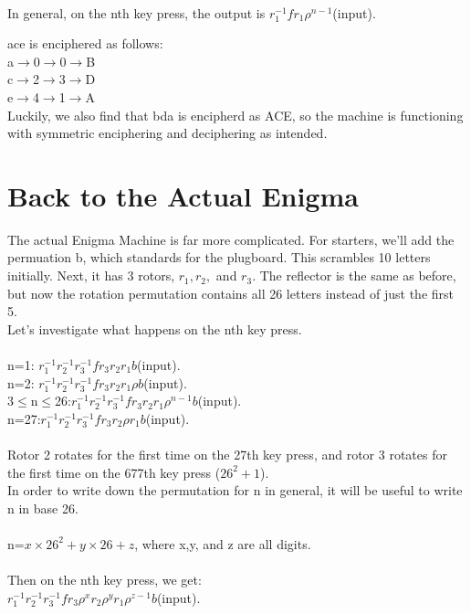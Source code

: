 \begin{example}
\begin{example}
\\In general, on the nth key press, the output is $r_{1}^{-1}f r_{1} \rho^{n-1}$(input).
\begin{example} ace is enciphered as follows:
\\a$\rightarrow$0$\longrightarrow$0$\longrightarrow$B\\ c$\rightarrow$2$\longrightarrow$3$\longrightarrow$D\\e$\rightarrow$4$\longrightarrow$1$\longrightarrow$A
\\Luckily, we also find that bda is encipherd as ACE, so the machine is functioning with symmetric enciphering and deciphering as intended.\end{example}
\section{Back to the Actual Enigma} The actual Enigma Machine is far more complicated. For starters, we'll add the permuation b, which standards for the plugboard. This scrambles 10 letters initially. Next, it has 3 rotors, $r_{1}, r_{2},$ and $r_{3}$. The reflector is the same as before, but now the rotation permutation contains all 26 letters instead of just the first 5.
\\ Let's investigate what happens on the nth key press.
\\\\n=1: $r_{1}^{-1}r_{2}^{-1}r_{3}^{-1}fr_{3}r_{2}r_{1}b$(input).
\\n=2: $r_{1}^{-1}r_{2}^{-1}r_{3}^{-1}fr_{3}r_{2}r_{1}\rho b$(input).
\\3$\leq$n$\leq$26:$r_{1}^{-1}r_{2}^{-1}r_{3}^{-1}fr_{3}r_{2}r_{1}\rho^{n-1} b$(input).
\\n=27:$r_{1}^{-1}r_{2}^{-1}r_{3}^{-1}fr_{3}r_{2}\rho r_{1}b$(input).
\\\\ Rotor 2 rotates for the first time on the 27th key press, and rotor 3 rotates for the first time on the 677th key press ($26^{2}+1$).
\\In order to write down the permutation for n in general, it will be useful to write n in base 26.
\\\\n=$x\times 26^{2} + y\times 26 + z$, where x,y, and z are all digits.
\\\\ Then on the nth key press, we get:
\\$r_{1}^{-1}r_{2}^{-1}r_{3}^{-1}fr_{3}\rho^{x}r_{2}\rho^{y}r_{1}\rho^{z-1} b$(input).

\end{example}
\end{example}
